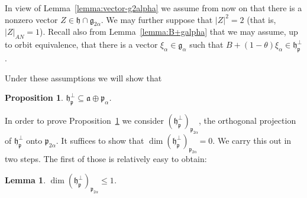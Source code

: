 \documentclass[12pt, a4paper]{amsart}
\newcommand{\g}{\mathfrak}
\newtheorem{lemma}[theorem]{Lemma}
\newtheorem{proposition}[theorem]{Proposition}
\theoremstyle{definition}
\begin{document}
In view of Lemma~\ref{lemma:vector-g2alpha} we assume from now on that there is a nonzero vector $Z\in\g{h}\cap\g{g}_{2\alpha}$.
We may further suppose that $\lvert Z\rvert^2=2$ (that is, $\lvert Z\rvert_{AN}=1$).
Recall also from Lemma~\ref{lemma:B+galpha} that we may assume, up to orbit equivalence, that there is a vector $\xi_\alpha\in\g{g}_\alpha$ such that $B+(1-\theta)\xi_\alpha\in\g{h}_{\g{p}}^\perp$.

Under these assumptions we will show that

\begin{proposition}\label{prop:section-in-a+p1}
$\g{h}_{\g{p}}^\perp\subseteq\g{a}\oplus\g{p}_\alpha$.
\end{proposition}

In order to prove Proposition~\ref{prop:section-in-a+p1} we consider $(\g{h}_{\g{p}}^\perp)_{\g{p}_{2\alpha}}$, the orthogonal projection of $\g{h}_{\g{p}}^\perp$ onto $\g{p}_{2\alpha}$.
It suffices to show that $\dim(\g{h}_{\g{p}}^\perp)_{\g{p}_{2\alpha}}=0$.
We carry this out in two steps.  
The first of those is relatively easy to obtain:

\begin{lemma}
$\dim(\g{h}_{\g{p}}^\perp)_{\g{p}_{2\alpha}}\leq 1$.
\end{lemma}
\end{document}
